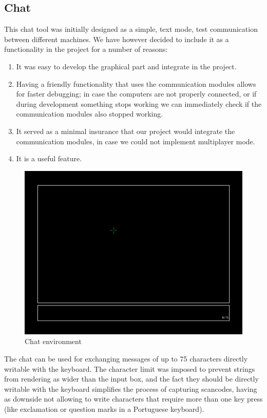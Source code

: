 \documentclass{article}
\theoremstyle{remark}
\begin{document}
\subsection{Chat}
This chat tool was initially designed as a simple, text mode, test communication between different machines. We have however decided to include it as a functionality in the project for a number of reasons:
\begin{enumerate}
	\item It was easy to develop the graphical part and integrate in the project.
	\item Having a friendly functionality that uses the communication modules allows for faster debugging; in case the computers are not properly connected, or if during development something stops working we can immediately check if the communication modules also stopped working.
	\item It served as a minimal insurance that our project would integrate the communication modules, in case we could not implement multiplayer mode.
	\item It is a useful feature.
\end{enumerate}
\begin{figure}[H] \centering
	\includegraphics[scale=0.45]{chat01}
	\caption{Chat environment}
\end{figure}
The chat can be used for exchanging messages of up to 75 characters directly writable with the keyboard. The character limit was imposed to prevent strings from rendering as wider than the input box, and the fact they should be directly writable with the keyboard simplifies the process of capturing scancodes, having as downside not allowing to write characters that require more than one key press (like exclamation or question marks in a Portuguese keyboard). \par
\end{document}
